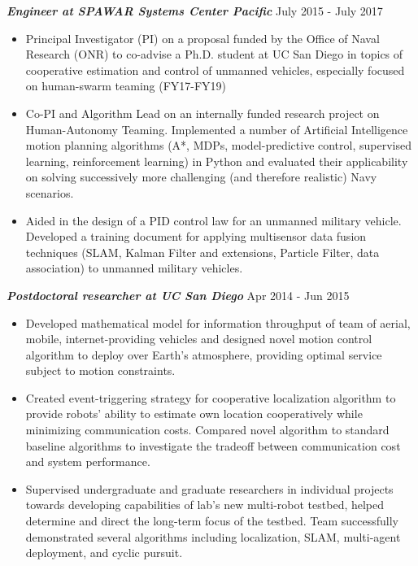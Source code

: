 \documentclass{res}
\begin{document}
\begin{resume}
\begin{itemize}
\end{itemize}
\vspace*{-1ex}
{\sl \bf Engineer at SPAWAR Systems Center Pacific} \hfill July 2015 - July 2017 
\begin{itemize}
\item Principal Investigator (PI) on a proposal funded by the Office of Naval Research (ONR) to co-advise a Ph.D. student at UC San Diego in topics of cooperative estimation and control of unmanned vehicles, especially focused on human-swarm teaming (FY17-FY19)
\item Co-PI and Algorithm Lead on an internally funded research project on Human-Autonomy Teaming. Implemented a number of Artificial Intelligence motion planning algorithms (A*, MDPs, model-predictive control, supervised learning, reinforcement learning) in Python and evaluated their applicability on solving successively more challenging (and therefore realistic) Navy scenarios.
\item Aided in the design of a PID control law for an unmanned military vehicle.  Developed a training document for applying multisensor data fusion techniques (SLAM, Kalman Filter and extensions, Particle Filter, data association) to unmanned military vehicles.
\end{itemize}
\vspace*{-1ex}
{\sl \bf Postdoctoral researcher at UC San Diego} \hfill Apr 2014 - Jun 2015 
\begin{itemize}
\item Developed mathematical model for information throughput of team of aerial, mobile, internet-providing vehicles and designed novel motion control algorithm to deploy over Earth's atmosphere, providing optimal service subject to motion constraints.
%
\item Created event-triggering strategy for cooperative localization algorithm to provide robots' ability to estimate own location cooperatively while minimizing communication costs. Compared novel algorithm to standard baseline algorithms to investigate the tradeoff between communication cost and system performance.
\item Supervised undergraduate and graduate researchers in individual projects towards developing capabilities of lab's new multi-robot testbed, helped determine and direct the long-term focus of the testbed.  Team successfully demonstrated several algorithms including localization, SLAM, multi-agent deployment, and cyclic pursuit. 
\end{itemize}

\end{resume}
\end{document}
